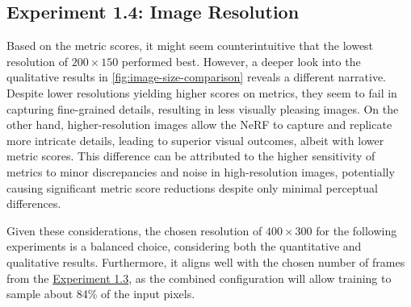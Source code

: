 \subsection{Experiment 1.4: Image Resolution}
Based on the metric scores, it might seem counterintuitive that the lowest resolution of $200 \times 150$ performed best. However, a deeper look into the qualitative results in \autoref{fig:image-size-comparison} reveals a different narrative. Despite lower resolutions yielding higher scores on metrics, they seem to fail in capturing fine-grained details, resulting in less visually pleasing images. On the other hand, higher-resolution images allow the NeRF to capture and replicate more intricate details, leading to superior visual outcomes, albeit with lower metric scores. This difference can be attributed to the higher sensitivity of metrics to minor discrepancies and noise in high-resolution images, potentially causing significant metric score reductions despite only minimal perceptual differences.

Given these considerations, the chosen resolution of $400 \times 300$ for the following experiments is a balanced choice, considering both the quantitative and qualitative results. Furthermore, it aligns well with the chosen number of frames from the \hyperref[sec:exp-number-of-frames]{Experiment 1.3}, as the combined configuration will allow training to sample about 84\% of the input pixels.

